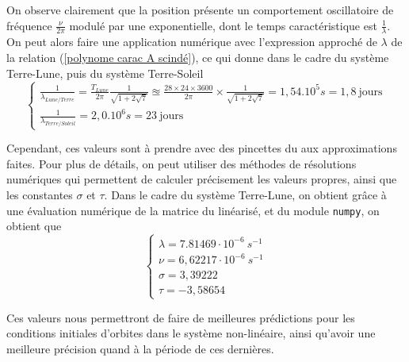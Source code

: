 \documentclass[12pt]{article}
\theoremstyle{definition}
\theoremstyle{definition}
\begin{document}
	On observe clairement que la position présente un comportement oscillatoire de fréquence $\frac{\nu}{2\pi}$ modulé par une exponentielle, dont le temps caractéristique est $\frac{1}{\lambda}$. On peut alors faire une application numérique avec l'expression approché de $\lambda$ de la relation (\ref{polynome carac A scindé}), ce qui donne dans le cadre du système Terre-Lune, puis du système Terre-Soleil
	\begin{equation}
		\begin{cases}
			\frac{1}{\lambda_{Lune/Terre}} = \frac{T_{Lune}}{2\pi}\frac{1}{\sqrt{1+2\sqrt{7}}} \approxeq \frac{28\times24\times3600}{2\pi}\times\frac{1}{\sqrt{1+2\sqrt{7}}} = 1,54.10^{5}s = 1,8 \ \text{jours}
			\\
			\frac{1}{\lambda_{Terre/Soleil}} = 2,0.10^6s = 23 \ \text{jours}
		\end{cases}
	\end{equation}
	
	Cependant, ces valeurs sont à prendre avec des pincettes du aux approximations faites. Pour plus de détails, on peut utiliser des méthodes de résolutions numériques qui permettent de calculer précisement les valeurs propres, ainsi que les constantes $\sigma$ et $\tau$. Dans le cadre du système Terre-Lune, on obtient grâce à une évaluation numérique de la matrice du linéarisé, et du module \verb|numpy|, on obtient que 
	\begin{equation}
		\begin{cases}
			\lambda = 7.81469 \cdot 10^{-6} \: s^{-1}
			\\
			\nu = 6,62217\cdot 10^{-6} \: s^{-1}
			\\
			\sigma = 3,39222 %
			\\
			\tau = -3,58654
		\end{cases}
	\end{equation}
	
	Ces valeurs nous permettront de faire de meilleures prédictions pour les conditions initiales d'orbites dans le système non-linéaire, ainsi qu'avoir une meilleure précision quand à la période de ces dernières.
	
	
	\clearpage
	
\end{document}
